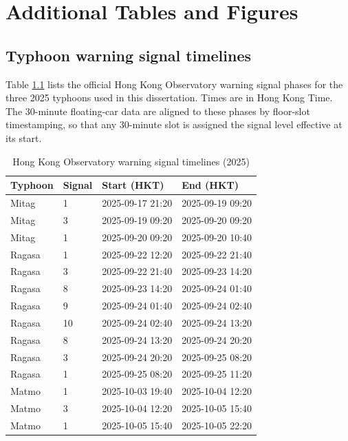 \documentclass[12pt,a4paper]{report}
\begin{document}
\printbibliography[title={References}]

\appendix
\chapter{Additional Tables and Figures}

\section{Typhoon warning signal timelines}
Table \ref{tab:signal_timeline} lists the official Hong Kong Observatory warning signal phases for the three 2025 typhoons used in this dissertation. Times are in Hong Kong Time. The 30-minute floating-car data are aligned to these phases by floor-slot timestamping, so that any 30-minute slot is assigned the signal level effective at its start.

\begin{table}[H]
\centering
\caption{Hong Kong Observatory warning signal timelines (2025)}
\label{tab:signal_timeline}
\begin{tabularx}{\textwidth}{llll}
\toprule
Typhoon & Signal & Start (HKT) & End (HKT) \\
\midrule
Mitag  & 1  & 2025-09-17 21:20 & 2025-09-19 09:20 \\
Mitag  & 3  & 2025-09-19 09:20 & 2025-09-20 09:20 \\
Mitag  & 1  & 2025-09-20 09:20 & 2025-09-20 10:40 \\
\midrule
Ragasa & 1  & 2025-09-22 12:20 & 2025-09-22 21:40 \\
Ragasa & 3  & 2025-09-22 21:40 & 2025-09-23 14:20 \\
Ragasa & 8  & 2025-09-23 14:20 & 2025-09-24 01:40 \\
Ragasa & 9  & 2025-09-24 01:40 & 2025-09-24 02:40 \\
Ragasa & 10 & 2025-09-24 02:40 & 2025-09-24 13:20 \\
Ragasa & 8  & 2025-09-24 13:20 & 2025-09-24 20:20 \\
Ragasa & 3  & 2025-09-24 20:20 & 2025-09-25 08:20 \\
Ragasa & 1  & 2025-09-25 08:20 & 2025-09-25 11:20 \\
\midrule
Matmo  & 1  & 2025-10-03 19:40 & 2025-10-04 12:20 \\
Matmo  & 3  & 2025-10-04 12:20 & 2025-10-05 15:40 \\
Matmo  & 1  & 2025-10-05 15:40 & 2025-10-05 22:20 \\
\bottomrule
\end{tabularx}
\end{table}
\end{document}
